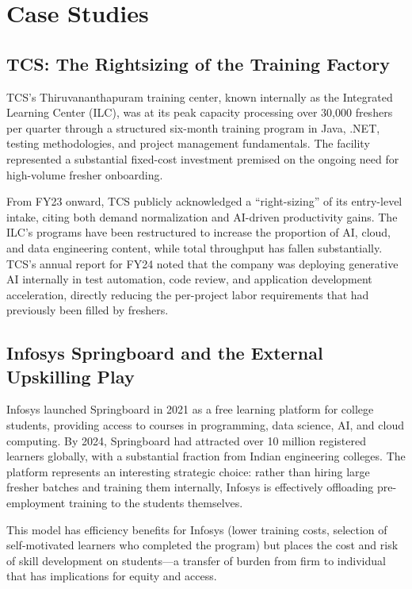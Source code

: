 \documentclass[conference]{IEEEtran}
\begin{document}
\section{Case Studies}
\label{sec:cases}

\subsection{TCS: The Rightsizing of the Training Factory}

TCS's Thiruvananthapuram training center, known internally as the Integrated Learning Center (ILC), was at its peak capacity processing over 30,000 freshers per quarter through a structured six-month training program in Java, .NET, testing methodologies, and project management fundamentals. The facility represented a substantial fixed-cost investment premised on the ongoing need for high-volume fresher onboarding.

From FY23 onward, TCS publicly acknowledged a ``right-sizing'' of its entry-level intake, citing both demand normalization and AI-driven productivity gains. The ILC's programs have been restructured to increase the proportion of AI, cloud, and data engineering content, while total throughput has fallen substantially. TCS's annual report for FY24 noted that the company was deploying generative AI internally in test automation, code review, and application development acceleration, directly reducing the per-project labor requirements that had previously been filled by freshers.

\subsection{Infosys Springboard and the External Upskilling Play}

Infosys launched Springboard in 2021 as a free learning platform for college students, providing access to courses in programming, data science, AI, and cloud computing. By 2024, Springboard had attracted over 10 million registered learners globally, with a substantial fraction from Indian engineering colleges. The platform represents an interesting strategic choice: rather than hiring large fresher batches and training them internally, Infosys is effectively offloading pre-employment training to the students themselves.

This model has efficiency benefits for Infosys (lower training costs, selection of self-motivated learners who completed the program) but places the cost and risk of skill development on students---a transfer of burden from firm to individual that has implications for equity and access.
\end{document}

